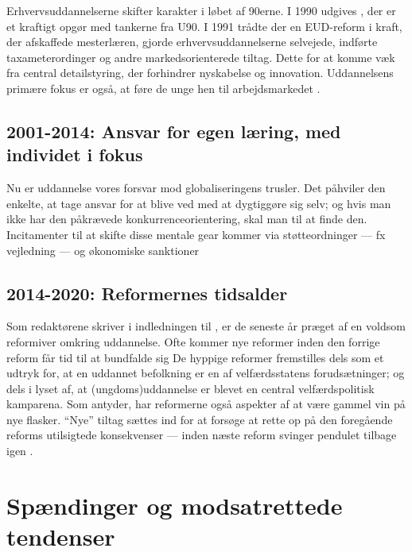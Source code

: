 Erhvervsuddannelserne skifter karakter i løbet af 90erne.
I 1990 udgives , der er et kraftigt opgør med tankerne fra U90.
I 1991 trådte der en EUD-reform i kraft, der afskaffede mesterlæren, gjorde erhvervsuddannelserne selvejede, indførte taxameterordinger og andre markedsorienterede tiltag.
Dette for at komme væk fra central detailstyring, der forhindrer nyskabelse og innovation.
Uddannelsens primære fokus er også, at føre de unge hen til arbejdsmarkedet \autocite[s. 19]{juulDiskurserOmUngdom2013}.

\subsection{2001-2014: Ansvar for egen læring, med individet i fokus}

Nu er uddannelse vores forsvar mod globaliseringens trusler.
Det påhviler den enkelte, at tage ansvar for at blive ved med at dygtiggøre sig selv; og hvis man ikke har den påkrævede konkurrenceorientering, skal man til at finde den.
Incitamenter til at skifte disse mentale gear kommer via støtteordninger — fx vejledning — og økonomiske sanktioner

\subsection{2014-2020: Reformernes tidsalder}

Som redaktørene skriver i indledningen til , er de seneste år præget af en voldsom reformiver omkring uddannelse.
Ofte kommer nye reformer inden den forrige reform får tid til at bundfalde sig
De hyppige reformer fremstilles dels som et udtryk for, at en uddannet befolkning er en af velfærdsstatens forudsætninger; og dels i lyset af, at (ungdoms)uddannelse er blevet en central velfærdspolitisk kamparena.
Som \citeauthor{jorgensenReformenAfErhvervsuddannelserne2016} antyder, har reformerne også aspekter af at være gammel vin på nye flasker.
“Nye” tiltag sættes ind for at forsøge at rette op på den foregående reforms utilsigtede konsekvenser — inden næste reform svinger pendulet tilbage igen \autocite[s.9 ]{jorgensenReformenAfErhvervsuddannelserne2016}.

\section{Spændinger og modsatrettede tendenser}

